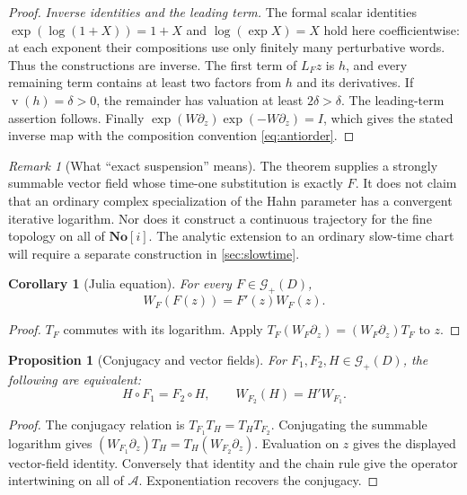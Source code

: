 \documentclass[11pt,a4paper]{article}
\numberwithin{equation}{section}
\newtheorem{proposition}[proposition]{Proposition}
\newtheorem{corollary}[corollary]{Corollary}
\theoremstyle{definition}
\theoremstyle{remark}
\newtheorem{remark}[remark]{Remark}
\newcommand{\No}{\mathbf{No}}
\newcommand{\A}{\mathcal A}
\newcommand{\G}{\mathcal G}
\newcommand{\val}{\operatorname{v}}
\begin{document}
\begin{proof}
\emph{Inverse identities and the leading term.}
The formal scalar identities
$\exp(\log(1+X))=1+X$ and $\log(\exp X)=X$ hold here coefficientwise:
at each exponent their compositions use only finitely many perturbative
words.  Thus the constructions are inverse.  The first term of $L_Fz$
is $h$, and every remaining term contains at least two factors from
$h$ and its derivatives.  If $\val(h)=\delta>0$, the remainder has
valuation at least $2\delta>\delta$.  The leading-term assertion follows.
Finally $\exp(W\partial_z)\exp(-W\partial_z)=I$, which gives the
stated inverse map with the composition convention
\eqref{eq:antiorder}.
\end{proof}

\begin{remark}[What ``exact suspension'' means]
The theorem supplies a strongly summable vector field whose time-one
substitution is exactly $F$.  It does not claim that an ordinary complex
specialization of the Hahn parameter has a convergent iterative logarithm.
Nor does it construct a continuous trajectory for the fine topology on
all of $\No[i]$.  The analytic extension to an ordinary slow-time chart
will require a separate construction in \cref{sec:slowtime}.
\end{remark}

\begin{corollary}[Julia equation]\label{cor:julia}
For every $F\in\G_+(D)$,
\begin{equation}\label{eq:julia}
 W_F(F(z))=F'(z)W_F(z).
\end{equation}
\end{corollary}
\begin{proof}
$T_F$ commutes with its logarithm.  Apply
$T_F(W_F\partial_z)=(W_F\partial_z)T_F$ to $z$.
\end{proof}

\begin{proposition}[Conjugacy and vector fields]\label{prop:intertwine}
For $F_1,F_2,H\in\G_+(D)$, the following are equivalent:
\[
 H\circ F_1=F_2\circ H,
 \qquad W_{F_2}(H)=H'W_{F_1}.
\]
\end{proposition}
\begin{proof}
The conjugacy relation is $T_{F_1}T_H=T_HT_{F_2}$.  Conjugating the
summable logarithm gives
$(W_{F_1}\partial_z)T_H=T_H(W_{F_2}\partial_z)$.
Evaluation on $z$ gives the displayed vector-field identity.  Conversely
that identity and the chain rule give the operator intertwining on all
of $\A$.  Exponentiation recovers the conjugacy.
\end{proof}
\end{document}
